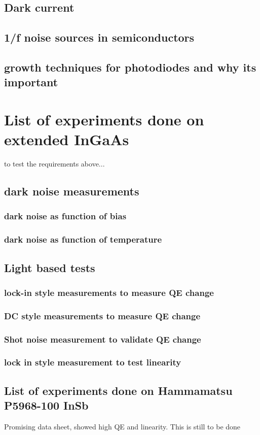 \subsection{Dark current}
\subsection{1/f noise sources in semiconductors}
\subsection{growth techniques for photodiodes and why its important}
\section{List of experiments done on extended InGaAs}
to test the requirements above...
\subsection{dark noise measurements}
\subsubsection{dark noise as function of bias}
\subsubsection{dark noise as function of temperature}
\subsection{Light based tests}
\subsubsection{lock-in style measurements to measure QE change}
\subsubsection{DC style measurements to measure QE change}
\subsubsection{Shot noise measurement to validate QE change}
\subsubsection{lock in style measurement to test linearity}
\subsection{List of experiments done on Hammamatsu P5968-100 InSb}
Promising data sheet, showed high QE and linearity. This is still to be done
